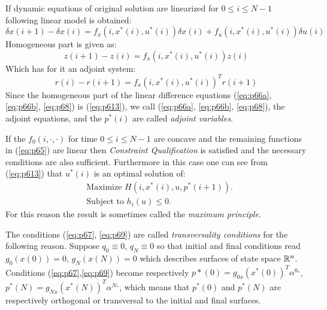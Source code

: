 \noindent If dynamic equations of original solution are linearized for $0 \le i \le N-1$  following linear model is obtained:
\begin{equation}
    \delta x(i+1) - \delta x(i) = f_x(i,x^*(i),u^*(i))\delta x(i) + f_u (i,x^*(i),u^*(i))\delta u(i)
\end{equation}
\noindent Homogeneous part is given as:
\begin{equation}
    z(i+1)- z(i) = f_x(i, x^*(i),u^*(i)) z(i)
\end{equation}
\noindent Which has for it an adjoint system:
\begin{equation}\label{eq:p613}
    r(i) - r(i+1) = f_x(i, x^*(i),u^*(i))^T r(i+1)
\end{equation}
\noindent Since the homogeneous part of the linear difference equations (\ref{eq:p66a}, \ref{eq:p66b}, \ref{eq:p68}) is (\ref{eq:p613}), we call (\ref{eq:p66a}, \ref{eq:p66b}, \ref{eq:p68}), the adjoint equations, and the $p^*(i)$ are called \textit{adjoint variables}.

If the $f_0(i,\cdot,\cdot)$ for time $0 \le i \le N-1$ are concave and the remaining functions in (\ref{eq:p65}) are linear then \textit{Constraint Qualification} is satisfied and the necessary conditions are also sufficient. Furthermore in this case one can see from (\ref{eq:p613}) that $u^*(i)$ is an optimal solution of:
\begin{equation}
    \begin{split}
        &\text{Maximize } H(i,x^*(i),u,p^*(i+1)).\\
        &\text{Subject to } h_i(u)\le 0.
    \end{split}
\end{equation}
\noindent For this reason the result is sometimes called the \textit{maximum principle}.

The conditions (\ref{eq:p67}, \ref{eq:p69}) are called \textit{transversality conditions} for the following reason. Suppose $q_0 \equiv 0$, $q_N \equiv 0$ so that initial and final conditions read $g_0(x(0))=0$, $g_N(x(N))=0$ which describes surfaces of state space $\mathbb{R}^n$. Conditions (\ref{eq:p67},\ref{eq:p69}) become respectively $p*(0) = g_{0x}(x^*(0))^T \alpha^{0_*}$, $p^*(N)= g_{Nx}(x^*(N))^T \alpha^{N_*}$, which means that $p^*(0)$ and $p^*(N)$ are respectively orthogonal or transversal to the initial and final surfaces.

